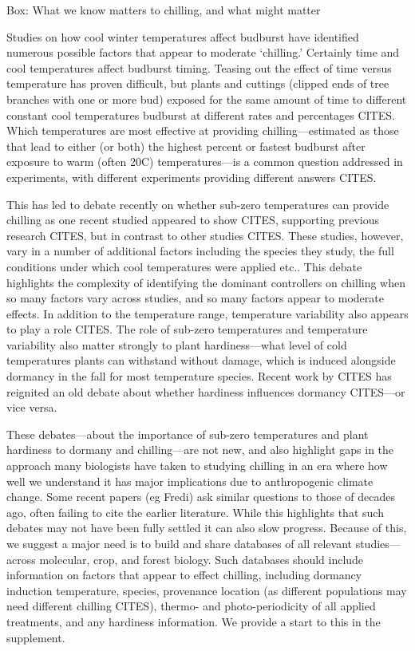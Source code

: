 \documentclass[11pt]{article}
\begin{document}
{\sc Box: What we know matters to chilling, and what might matter} %

Studies on how cool winter temperatures affect budburst have identified numerous possible factors that appear to moderate `chilling.' Certainly time and cool temperatures affect budburst timing. Teasing out the effect of time versus temperature has proven difficult, but plants and cuttings (clipped ends of tree branches with one or more bud) exposed for the same amount of time to different constant cool temperatures budburst at different rates and percentages CITES. Which temperatures are most effective at providing chilling---estimated as those that lead to either (or both) the highest percent or fastest budburst after exposure to warm (often 20\degree C) temperatures---is a common question addressed in experiments, with different experiments providing different answers CITES. 

This has led to debate recently on whether sub-zero temperatures can provide chilling as one recent studied appeared to show CITES, supporting previous research CITES, but in contrast to other studies CITES. These studies, however, vary in a number of additional factors including the species they study, the full conditions under which cool temperatures were applied etc.. This debate highlights the complexity of identifying the dominant controllers on chilling when so many factors vary across studies, and so many factors appear to moderate effects. In addition to the temperature range, temperature variability also appears to play a role CITES. The role of sub-zero temperatures and temperature variability also matter strongly to plant hardiness---what level of cold temperatures plants can withstand without damage, which is induced alongside dormancy in the fall for most temperature species. Recent work by CITES has reignited an old debate about whether hardiness influences dormancy CITES---or vice versa. 

These debates---about the importance of sub-zero temperatures and plant hardiness to dormany and chilling---are not new, and also highlight gaps in the approach many biologists have taken to studying chilling in an era where how well we understand it has major implications due to anthropogenic climate change. Some recent papers (eg Fredi) ask similar questions to those of decades ago, often failing to cite the earlier literature. While this highlights that such debates may not have been fully settled it can also slow progress. Because of this, we suggest a major need is to build and share databases of all relevant studies---across molecular, crop, and forest biology. Such databases should include information on factors that appear to effect chilling, including dormancy induction temperature, species, provenance location (as different populations may need different chilling CITES), thermo- and photo-periodicity of all applied treatments, and any hardiness information. We provide a start to this in the supplement. %
\end{document}
